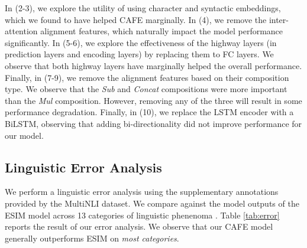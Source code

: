 \documentclass[11pt,a4paper]{article}
\begin{document}
In (2-3), we explore the utility of using character and syntactic embeddings, which we found to have helped CAFE marginally. In (4), we remove the inter-attention alignment features, which naturally impact the model performance significantly. In (5-6), we explore the effectiveness of the highway layers (in prediction layers and encoding layers) by replacing them to FC layers. We observe that both highway layers have marginally helped the overall performance. Finally, in (7-9), we remove the alignment features based on their composition type. We observe that the \textit{Sub} and \textit{Concat} compositions were more important than the \textit{Mul} composition. However, removing any of the three will result in some performance degradation. Finally, in (10), we replace the LSTM encoder with a BiLSTM, observing that adding bi-directionality did not improve performance for our model.




\subsection{Linguistic Error Analysis}



We perform a linguistic error analysis using the supplementary annotations provided by the MultiNLI dataset. We compare against the model outputs of the ESIM model across 13 categories of linguistic phenenoma \cite{DBLP:journals/corr/WilliamsNB17}.
Table \ref{tab:error} reports the result of our error analysis. We observe that our CAFE model generally outperforms ESIM on \textit{most categories}.
\end{document}
